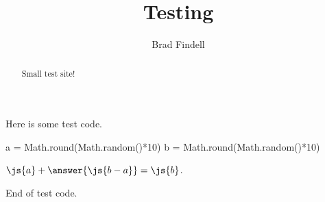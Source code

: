 \documentclass[nooutcomes]{ximera}
\title{Testing}
\author{Brad Findell}
\begin{document}
\begin{abstract}
Small test site! 
\end{abstract}
\maketitle

Here is some test code. 

    \begin{javascript}
      a = Math.round(Math.random()*10)
      b = Math.round(Math.random()*10)
    \end{javascript}
    
    \begin{problem}
      $\js{a} + \answer{\js{b-a}} = \js{b}$.
    \end{problem}
End of test code. 


\end{document}
